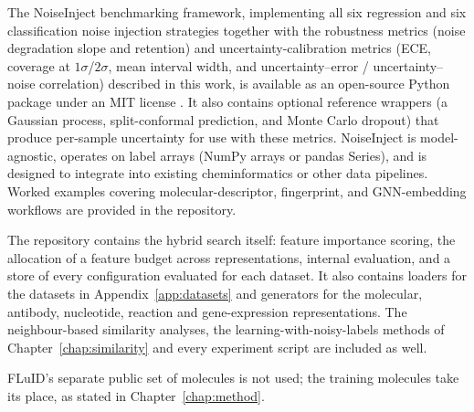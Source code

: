 
The NoiseInject benchmarking framework, implementing all six regression and six classification noise injection strategies together with the robustness metrics (noise degradation slope and retention) and uncertainty-calibration metrics (ECE, coverage at $1\sigma$/$2\sigma$, mean interval width, and uncertainty--error / uncertainty--noise correlation) described in this work, is available as an open-source Python package under an MIT license \citep{noiseinject}. It also contains optional reference wrappers (a Gaussian process, split-conformal prediction, and Monte Carlo dropout) that produce per-sample uncertainty for use with these metrics. NoiseInject is model-agnostic, operates on label arrays (NumPy arrays or pandas Series), and is designed to integrate into existing cheminformatics or other data pipelines. Worked examples covering molecular-descriptor, fingerprint, and GNN-embedding workflows are provided in the repository.

The repository contains the hybrid search itself: feature importance scoring, the allocation of a feature budget across representations, internal evaluation, and a store of every configuration evaluated for each dataset. It also contains loaders for the datasets in Appendix~\ref{app:datasets} and generators for the molecular, antibody, nucleotide, reaction and gene-expression representations. The neighbour-based similarity analyses, the learning-with-noisy-labels methods of Chapter~\ref{chap:similarity} and every experiment script are included as well.

FLuID's separate public set of molecules is not used; the training molecules take its place, as stated in Chapter~\ref{chap:method}.

